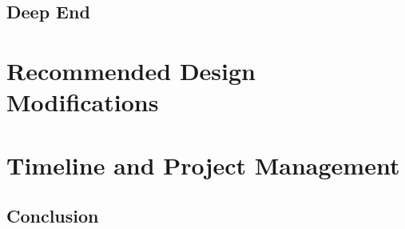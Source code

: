 \documentclass{report}
\begin{document}
\section{Deep End}

\newpage
\chapter{Recommended Design Modifications}

\newpage
\chapter{Timeline and Project Management}

\newpage
\section{Conclusion}

\newpage
{}




\end{document}

